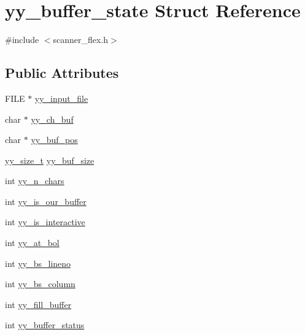 \hypertarget{structyy__buffer__state}{\section{yy\-\_\-buffer\-\_\-state \-Struct \-Reference}
\label{structyy__buffer__state}
}


{\ttfamily \#include $<$scanner\-\_\-flex.\-h$>$}

\subsection*{\-Public \-Attributes}
\begin{DoxyCompactItemize}
\item 
\-F\-I\-L\-E $\ast$ \hyperlink{structyy__buffer__state_a4360acfb226a1fc240ab2be17dd6beda}{yy\-\_\-input\-\_\-file}
\item 
char $\ast$ \hyperlink{structyy__buffer__state_a0d25458e69eb22207fc633a1255d099d}{yy\-\_\-ch\-\_\-buf}
\item 
char $\ast$ \hyperlink{structyy__buffer__state_a8435c3f786bbb55d21d0174e4cfc22a0}{yy\-\_\-buf\-\_\-pos}
\item 
\hyperlink{scanner_8c_ad557845057f187eec4be07e2717d2afa}{yy\-\_\-size\-\_\-t} \hyperlink{structyy__buffer__state_a48302f5f3477a9c78bbddf56d356ef54}{yy\-\_\-buf\-\_\-size}
\item 
int \hyperlink{structyy__buffer__state_a06406208824817acfec2183b79080945}{yy\-\_\-n\-\_\-chars}
\item 
int \hyperlink{structyy__buffer__state_a80ce2431c70dc4f89ced487f18449465}{yy\-\_\-is\-\_\-our\-\_\-buffer}
\item 
int \hyperlink{structyy__buffer__state_abf5c70eea75581b58c0ee7bd31b14490}{yy\-\_\-is\-\_\-interactive}
\item 
int \hyperlink{structyy__buffer__state_a9d60c60af6e1a6f69de16871fd64f85f}{yy\-\_\-at\-\_\-bol}
\item 
int \hyperlink{structyy__buffer__state_a818e94bc9c766e683c60df1e9fd01199}{yy\-\_\-bs\-\_\-lineno}
\item 
int \hyperlink{structyy__buffer__state_a10c4fcd8be759e6bf11e6d3e8cdb0307}{yy\-\_\-bs\-\_\-column}
\item 
int \hyperlink{structyy__buffer__state_a63d2afbb1d79a3fc63df9e12626f827d}{yy\-\_\-fill\-\_\-buffer}
\item 
int \hyperlink{structyy__buffer__state_a70fd925d37a2f0454fbd0def675d106c}{yy\-\_\-buffer\-\_\-status}
\end{DoxyCompactItemize}


